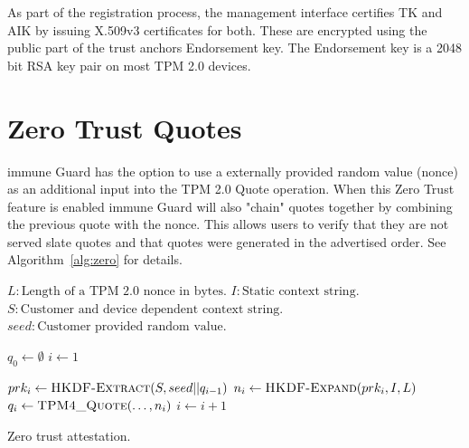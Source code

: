 \documentclass[a4paper,oneside,10pt,extrafontsizes]{memoir}
\begin{document}
\begin{appendix}
As part of the registration process, the management interface certifies TK and
AIK by issuing X.509v3 certificates for both. These are encrypted using the
public part of the trust anchors Endorsement key. The Endorsement key is a 2048
bit RSA key pair on most TPM 2.0 devices.

\pagebreak

\section{Zero Trust Quotes}
\label{app:zero}

immune Guard has the option to use a externally provided random value (nonce) as
an additional input into the TPM 2.0 Quote operation. When this Zero Trust
feature is enabled immune Guard will also "chain" quotes together by combining
the previous quote with the nonce. This allows users to verify that they are
not served slate quotes and that quotes were generated in the advertised order.
See Algorithm~\ref{alg:zero} for details.

\begin{algorithm}
  \begin{algorithmic}[1]
    \Require $L:\text{Length of a TPM 2.0 nonce in bytes.}$
    \Require $I:\text{Static context string.}$
    \Require $S:\text{Customer and device dependent context string.}$
    \Require $seed:\text{Customer provided random value.}$

      \State $q_0 \gets \emptyset$
      \State $i \gets 1$
      
      \Loop
        \State $prk_i \gets \Call{HKDF-Extract}{S, seed || q_{i-1}}$
        \State $n_i \gets \Call{HKDF-Expand}{prk_i, I , L}$
        \State $q_i \gets \Call{TPM4\_Quote}{\ldots, n_i}$
        \State $i \gets i+1$
      \EndLoop 
    \EndProcedure
  \end{algorithmic}
  \caption{Zero trust attestation.}
  \label{alg:zero}
\end{algorithm}





\end{appendix}
\end{document}
